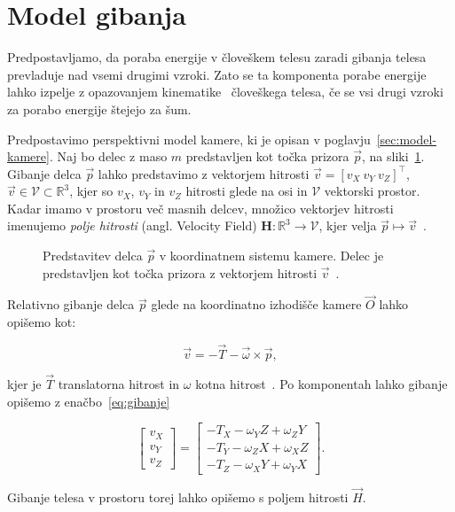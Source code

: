 \section{Model gibanja}\label{sec:model-gibanja}
Predpostavljamo, da poraba energije v človeškem telesu zaradi gibanja telesa prevladuje nad vsemi
drugimi vzroki. Zato se ta komponenta porabe energije lahko izpelje z opazovanjem kinematike~\cite{levine2005measurement} človeškega telesa, če se vsi drugi vzroki za porabo energije štejejo za šum.

Predpostavimo perspektivni model kamere, ki je opisan v poglavju~\ref{sec:model-kamere}.
Naj bo delec z maso $m$ predstavljen kot točka prizora $\vec{p}$, na sliki~\ref{fig:model-gibanja}. Gibanje delca $\vec{p}$ lahko predstavimo z vektorjem hitrosti $\vec{v} = [v_X~v_Y~v_Z]^\top$, $\vec{v} \in \mathcal{V} \subset \mathbb{R}^3$, kjer so $v_X$, $v_Y$ in $v_Z$ hitrosti glede na osi in $\mathcal{V}$ vektorski prostor. Kadar imamo v prostoru več masnih delcev, množico vektorjev hitrosti imenujemo \emph{polje hitrosti} (angl. Velocity Field) $\mathbf{H}: \mathbb{R}^3 \to \mathcal{V}$, kjer velja $\vec{p} \mapsto \vec{v}$~\cite{trucco1998introductory}.


\begin{figure}[htb]
\centering

\caption[Predstavitev delca $\vec{p}$ v koordinatnem sistemu kamere]{Predstavitev delca $\vec{p}$ v koordinatnem sistemu kamere. Delec je predstavljen kot točka prizora z vektorjem hitrosti $\vec{v}$~\cite{trucco1998introductory}.}
\label{fig:model-gibanja}
\end{figure}



Relativno gibanje delca $\vec{p}$ glede na koordinatno izhodišče kamere $\vec{O}$ lahko opišemo kot:

\begin{equation}
	\vec{v} = -\vec{T}-\vec{\omega}\times\vec{p},
\end{equation}

kjer je $\vec{T}$ translatorna hitrost in $\omega$ kotna hitrost~\cite{trucco1998introductory}. Po komponentah lahko gibanje opišemo z enačbo~\eqref{eq:gibanje}

\begin{equation} \label{eq:gibanje}
	\begin{bmatrix}
	v_X \\ v_Y \\ v_Z
	\end{bmatrix}
    =
    \begin{bmatrix}
    - T_X - \omega_Y Z + \omega_Z Y \\
    - T_Y - \omega_Z X + \omega_X Z \\
    - T_Z - \omega_X Y + \omega_Y X
    \end{bmatrix}.
\end{equation}

Gibanje telesa v prostoru torej lahko opišemo s poljem hitrosti $\vec{H}$.


